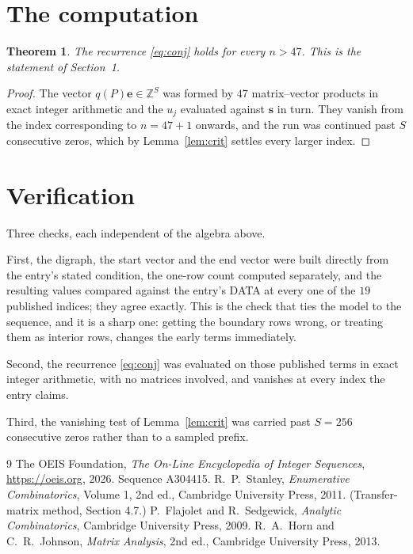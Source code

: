 \documentclass[11pt,a4paper]{article}
\theoremstyle{plain}
\newtheorem{theorem}{Theorem}
\theoremstyle{definition}
\begin{document}
\section{The computation}

\begin{theorem}
The recurrence \eqref{eq:conj} holds for every $n>47$. This is the statement of
Section~1.
\end{theorem}

\begin{proof}
The vector $q(P)\mathbf{e}\in\mathbb{Z}^{S}$ was formed by $47$ matrix--vector
products in exact integer arithmetic and the $u_j$ evaluated against $\mathbf{s}$ in turn.
They vanish from the index corresponding to $n=47+1$ onwards, and the run was continued
past $S$ consecutive zeros, which by Lemma~\ref{lem:crit} settles every larger index.
\end{proof}

\section{Verification}

Three checks, each independent of the algebra above.

First, the digraph, the start vector and the end vector were built directly from the
entry's stated condition, the one-row count computed separately, and the resulting values
compared against the entry's DATA at every one of the $19$ published indices; they
agree exactly. This is the check that ties the model to the sequence, and it is a sharp one:
getting the boundary rows wrong, or treating them as interior rows, changes the early terms
immediately.

Second, the recurrence \eqref{eq:conj} was evaluated on those published terms in exact
integer arithmetic, with no matrices involved, and vanishes at every index the entry claims.

Third, the vanishing test of Lemma~\ref{lem:crit} was carried past $S=256$ consecutive
zeros rather than to a sampled prefix.

\begin{thebibliography}{9}
 The OEIS Foundation, \emph{The On-Line Encyclopedia of Integer
Sequences}, \url{https://oeis.org}, 2026. Sequence A304415.
 R.~P.~Stanley, \emph{Enumerative Combinatorics}, Volume 1, 2nd ed.,
Cambridge University Press, 2011. (Transfer-matrix method, Section 4.7.)
 P.~Flajolet and R.~Sedgewick, \emph{Analytic Combinatorics}, Cambridge
University Press, 2009.
 R.~A.~Horn and C.~R.~Johnson, \emph{Matrix Analysis}, 2nd ed., Cambridge
University Press, 2013.
\end{thebibliography}
\end{document}
